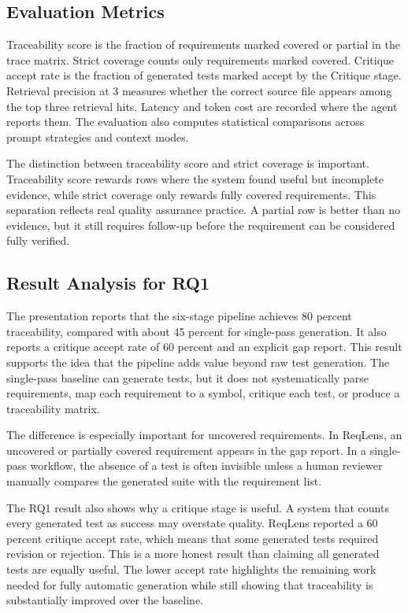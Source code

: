 \documentclass[conference]{IEEEtran}
\begin{document}
\subsection{Evaluation Metrics}
Traceability score is the fraction of requirements marked covered or partial
in the trace matrix. Strict coverage counts only requirements marked covered.
Critique accept rate is the fraction of generated tests marked accept by the
Critique stage. Retrieval precision at 3 measures whether the correct source
file appears among the top three retrieval hits. Latency and token cost are
recorded where the agent reports them. The evaluation also computes statistical
comparisons across prompt strategies and context modes.

The distinction between traceability score and strict coverage is important.
Traceability score rewards rows where the system found useful but incomplete
evidence, while strict coverage only rewards fully covered requirements. This
separation reflects real quality assurance practice. A partial row is better
than no evidence, but it still requires follow-up before the requirement can be
considered fully verified.

\subsection{Result Analysis for RQ1}
The presentation reports that the six-stage pipeline achieves 80 percent
traceability, compared with about 45 percent for single-pass generation. It
also reports a critique accept rate of 60 percent and an explicit gap report.
This result supports the idea that the pipeline adds value beyond raw test
generation. The single-pass baseline can generate tests, but it does not
systematically parse requirements, map each requirement to a symbol, critique
each test, or produce a traceability matrix.

The difference is especially important for uncovered requirements. In ReqLens,
an uncovered or partially covered requirement appears in the gap report. In a
single-pass workflow, the absence of a test is often invisible unless a human
reviewer manually compares the generated suite with the requirement list.

The RQ1 result also shows why a critique stage is useful. A system that counts
every generated test as success may overstate quality. ReqLens reported a 60
percent critique accept rate, which means that some generated tests required
revision or rejection. This is a more honest result than claiming all generated
tests are equally useful. The lower accept rate highlights the remaining work
needed for fully automatic generation while still showing that traceability is
substantially improved over the baseline.
\end{document}
